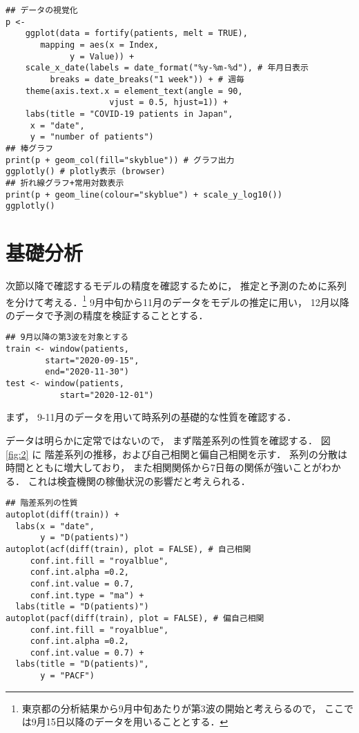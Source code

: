 \documentclass[10pt,oneside,fleqn]{scrartcl}
\begin{document}
\begin{verbatim}
## データの視覚化
p <-
    ggplot(data = fortify(patients, melt = TRUE),
	   mapping = aes(x = Index,
			 y = Value)) +
    scale_x_date(labels = date_format("%y-%m-%d"), # 年月日表示
		 breaks = date_breaks("1 week")) + # 週毎
    theme(axis.text.x = element_text(angle = 90, 
				     vjust = 0.5, hjust=1)) +
    labs(title = "COVID-19 patients in Japan",
	 x = "date",
	 y = "number of patients")
## 棒グラフ
print(p + geom_col(fill="skyblue")) # グラフ出力
ggplotly() # plotly表示 (browser)
## 折れ線グラフ+常用対数表示
print(p + geom_line(colour="skyblue") + scale_y_log10())
ggplotly()
\end{verbatim}

\section{基礎分析}
\label{sec:org94eee4e}

次節以降で確認するモデルの精度を確認するために，
推定と予測のために系列を分けて考える．\footnote{東京都の分析結果から9月中旬あたりが第3波の開始と考えらるので，
ここでは9月15日以降のデータを用いることとする．}
9月中旬から11月のデータをモデルの推定に用い，
12月以降のデータで予測の精度を検証することとする．

\begin{verbatim}
## 9月以降の第3波を対象とする
train <- window(patients,
		start="2020-09-15",
		end="2020-11-30")
test <- window(patients,
	       start="2020-12-01")
\end{verbatim}

まず，
9-11月のデータを用いて時系列の基礎的な性質を確認する．

データは明らかに定常ではないので，
まず階差系列の性質を確認する．
図\ref{fig:2} に
階差系列の推移，および自己相関と偏自己相関を示す．
系列の分散は時間とともに増大しており，
また相関関係から7日毎の関係が強いことがわかる．
これは検査機関の稼働状況の影響だと考えられる．

\begin{figure*}[htbp]
  \centering
\end{figure*}

\begin{verbatim}
## 階差系列の性質
autoplot(diff(train)) +
  labs(x = "date",
       y = "D(patients)")
autoplot(acf(diff(train), plot = FALSE), # 自己相関
	 conf.int.fill = "royalblue",
	 conf.int.alpha =0.2,
	 conf.int.value = 0.7,
	 conf.int.type = "ma") +
  labs(title = "D(patients)")
autoplot(pacf(diff(train), plot = FALSE), # 偏自己相関
	 conf.int.fill = "royalblue",
	 conf.int.alpha =0.2,
	 conf.int.value = 0.7) +
  labs(title = "D(patients)",
       y = "PACF")
\end{verbatim}
\end{document}
